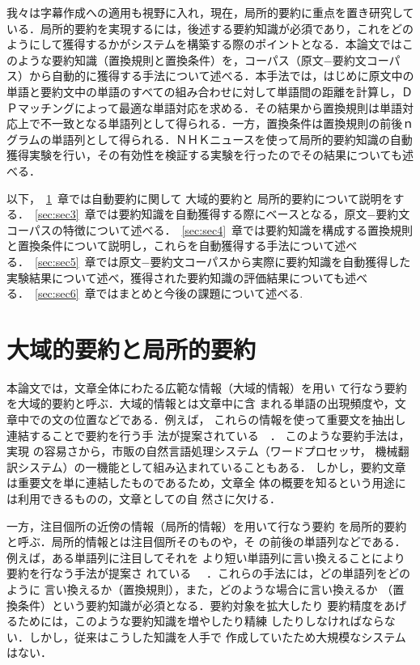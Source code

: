 我々は字幕作成への適用も視野に入れ，現在，局所的要約に重点を置き研究している．局所的要約を実現するには，後述する要約知識が必須であり，これをどのようにして獲得するかがシステムを構築する際のポイントとなる．本論文ではこのような要約知識（置換規則と置換条件）を，コーパス（原文−要約文コーパス）から自動的に獲得する手法について述べる．本手法では，はじめに原文中の単語と要約文中の単語のすべての組み合わせに対して単語間の距離を計算し，ＤＰマッチングによって最適な単語対応を求める．その結果から置換規則は単語対応上で不一致となる単語列として得られる．一方，置換条件は置換規則の前後ｎグラムの単語列として得られる．ＮＨＫニュースを使って局所的要約知識の自動獲得実験を行い，その有効性を検証する実験を行ったのでその結果についても述べる．

以下，~\ref{sec:sec2}~章では自動要約に関して{ \gt 大域的要約}と{ \gt 局所的要約}について説明をする．~\ref{sec:sec3}~章では要約知識を自動獲得する際にベースとなる，原文−要約文コーパスの特徴について述べる．~\ref{sec:sec4}~章では要約知識を構成する置換規則と置換条件について説明し，これらを自動獲得する手法について述べる．~\ref{sec:sec5}~章では原文−要約文コーパスから実際に要約知識を自動獲得した実験結果について述べ，獲得された要約知識の評価結果についても述べる．~\ref{sec:sec6}~章ではまとめと今後の課題について述べる.\newpage

\section{大域的要約と局所的要約}
\label{sec:sec2}
本論文では，文章全体にわたる広範な情報（大域的情報）を用い
て行なう要約を{\gt 大域的要約}と呼ぶ．大域的情報とは文章中に含
まれる単語の出現頻度や，文章中での文の位置などである．例えば，
これらの情報を使って重要文を抽出し連結することで要約を行う手
法が提案されている~\cite{Luhn58,Edmundson69,Watanabe95,Kupiec95,Zechner96}~．
このような要約手法は，実現
の容易さから，市販の自然言語処理システム（ワードプロセッサ，
機械翻訳システム）の一機能として組み込まれていることもある．
しかし，要約文章は重要文を単に連結したものであるため，文章全
体の概要を知るという用途には利用できるものの，文章としての自
然さに欠ける．

一方，注目個所の近傍の情報（局所的情報）を用いて行なう要約
を{\gt 局所的要約}と呼ぶ．局所的情報とは注目個所そのものや，そ
の前後の単語列などである．例えば，ある単語列に注目してそれを
より短い単語列に言い換えることにより要約を行なう手法が提案さ
れている~\cite{Yamamoto95,Wakao97,Yamazaki98}~
．これらの手法には，どの単語列をどのように
言い換えるか（置換規則），また，どのような場合に言い換えるか
（置換条件）という要約知識が必須となる．要約対象を拡大したり
要約精度をあげるためには，このような要約知識を増やしたり精練
したりしなければならない．しかし，従来はこうした知識を人手で
作成していたため大規模なシステムはない．

